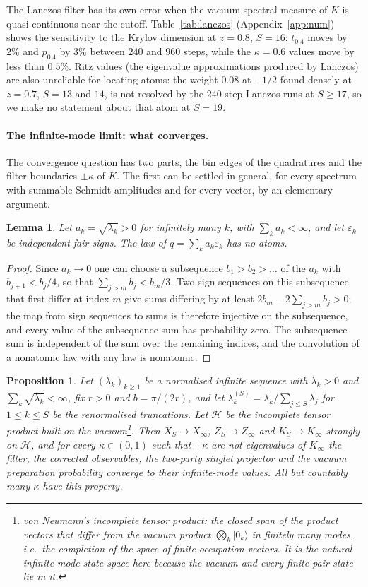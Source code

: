 \documentclass[11pt,a4paper]{article}
\newtheorem{proposition}{Proposition}
\newtheorem{lemma}{Lemma}
\newcommand{\ket}[1]{|#1\rangle}
\begin{document}
The Lanczos filter has its own error when the vacuum spectral measure of $K$ is quasi-continuous near the cutoff. Table~\ref{tab:lanczos} (Appendix~\ref{app:num}) shows the sensitivity to the Krylov dimension at $z=0.8$, $S=16$: $t_{0.4}$ moves by $2\%$ and $p_{0.4}$ by $3\%$ between $240$ and $960$ steps, while the $\kappa=0.6$ values move by less than $0.5\%$. Ritz values (the eigenvalue approximations produced by Lanczos) are also unreliable for locating atoms: the weight $0.08$ at $-1/2$ found densely at $z=0.7$, $S=13$ and $14$, is not resolved by the $240$-step Lanczos runs at $S\ge17$, so we make no statement about that atom at $S=19$.


\paragraph{The infinite-mode limit: what converges.}
The convergence question has two parts, the bin edges of the quadratures and the filter boundaries $\pm\kappa$ of $K$. The first can be settled in general, for every spectrum with summable Schmidt amplitudes and for every vector, by an elementary argument.
\begin{lemma}
\label{lem:nonatomic}
Let $a_k=\sqrt{\lambda_k}>0$ for infinitely many $k$, with $\sum_ka_k<\infty$, and let $\varepsilon_k$ be independent fair signs. The law of $q=\sum_ka_k\varepsilon_k$ has no atoms.
\end{lemma}
\begin{proof}
Since $a_k\to0$ one can choose a subsequence $b_1>b_2>\dots$ of the $a_k$ with $b_{j+1}<b_j/4$, so that $\sum_{j>m}b_j<b_m/3$. Two sign sequences on this subsequence that first differ at index $m$ give sums differing by at least $2b_m-2\sum_{j>m}b_j>0$; the map from sign sequences to sums is therefore injective on the subsequence, and every value of the subsequence sum has probability zero. The subsequence sum is independent of the sum over the remaining indices, and the convolution of a nonatomic law with any law is nonatomic.
\end{proof}
\begin{proposition}
\label{prop:infinite}
Let $(\lambda_k)_{k\ge1}$ be a normalised infinite sequence with $\lambda_k>0$ and $\sum_k\sqrt{\lambda_k}<\infty$, fix $r>0$ and $b=\pi/(2r)$, and let $\lambda^{(S)}_k=\lambda_k/\sum_{j\le S}\lambda_j$ for $1\le k\le S$ be the renormalised truncations. Let $\mathcal H$ be the incomplete tensor product built on the vacuum\footnote{von Neumann's incomplete tensor product: the closed span of the product vectors that differ from the vacuum product $\bigotimes_k\ket{0_k}$ in finitely many modes, i.e.\ the completion of the space of finite-occupation vectors. It is the natural infinite-mode state space here because the vacuum and every finite-pair state lie in it.}. Then $X_S\to X_\infty$, $Z_S\to Z_\infty$ and $K_S\to K_\infty$ strongly on $\mathcal H$, and for every $\kappa\in(0,1)$ such that $\pm\kappa$ are not eigenvalues of $K_\infty$ the filter, the corrected observables, the two-party singlet projector and the vacuum preparation probability converge to their infinite-mode values. All but countably many $\kappa$ have this property.
\end{proposition}
\end{document}
